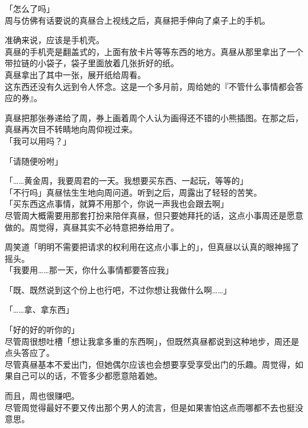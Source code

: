 「怎么了吗」\\

周与仿佛有话要说的真昼合上视线之后，真昼把手伸向了桌子上的手机。

准确来说，应该是手机壳。\\

真昼的手机壳是翻盖式的，上面有放卡片等等东西的地方。真昼从那里拿出了一个带拉链的小袋子，袋子里面放着几张折好的纸。\\

真昼拿出了其中一张，展开纸给周看。\\

这东西还没有久远到令人怀念。这是一个多月前，周给她的『不管什么事情都会答应的券』。

真昼把那张券递给了周，券上画着周个人认为画得还不错的小熊插图。在那之后，真昼再次目不转睛地向周仰视过来。\\

「我可以用吗？」

「请随便吩咐」

「……黄金周，我要周君的一天。我想要买东西、一起玩，等等的」\\

「不行吗」真昼怯生生地向周问道。听到之后，周露出了轻轻的苦笑。\\

「买东西这点事情，就算不用那个，你说一声我也会跟去啊」\\

尽管周大概需要用那套打扮来陪伴真昼，但只要她拜托的话，这点小事周还是愿意做的。周觉得，真昼其实不必特意把券给用了。

周笑道「明明不需要把请求的权利用在这点小事上的」，但真昼以认真的眼神摇了摇头。\\

「我要用……那一天，你什么事情都要答应我」

「既、既然说到这个份上也行吧，不过你想让我做什么啊……」

「……拿、拿东西」

「好的好的听你的」\\

尽管周很想吐槽「想让我拿多重的东西啊」，但既然真昼都说到这种地步，周还是点头答应了。\\

尽管真昼基本不爱出门，但她偶尔应该也会想要享受享受出门的乐趣。周觉得，如果自己可以的话，不管多少都愿意陪着她。

而且，周也很赚吧。\\

尽管周觉得最好不要又传出那个男人的流言，但是如果害怕这点而哪都不去也挺没意思。\\

